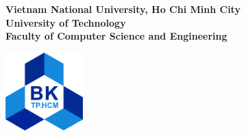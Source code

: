 \documentclass[a4paper]{article}
\begin{document}
\begin{titlepage}
    \begin{center}
        \textbf{\LARGE Vietnam National University, Ho Chi Minh City}\\
        \vspace{5pt}
        \textbf{\LARGE University of Technology}\\
        \vspace{5pt}
        \textbf{\LARGE Faculty of Computer Science and Engineering}\\

        \vspace{1cm}

        \includegraphics[width=3cm]{Images/hcmut.png}\\ %


\end{center}
\end{titlepage}
\end{document}
